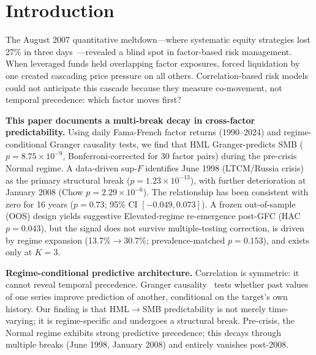 \documentclass[sigconf,anonymous]{acmart}
\begin{document}

\maketitle

\section{Introduction}

The August 2007 quantitative meltdown---where systematic equity strategies
lost 27\% in three days~\cite{khandani2011quants}---revealed a blind spot
in factor-based risk management. When leveraged funds held overlapping factor
exposures, forced liquidation by one created cascading price pressure on all
others. Correlation-based risk models could not anticipate this cascade because
they measure co-movement, not temporal precedence: which factor moves first?

\textbf{This paper documents a multi-break decay in cross-factor predictability.}
Using daily Fama-French factor returns (1990--2024) and regime-conditional
Granger causality tests, we find that HML Granger-predicts SMB
($p = 8.75 \times 10^{-9}$, Bonferroni-corrected for 30 factor pairs) during the
pre-crisis Normal regime. A data-driven sup-$F$ identifies June 1998 (LTCM/Russia crisis)
as the primary structural break ($p = 1.23\times10^{-13}$), with further
deterioration at January 2008 (Chow $p = 2.29\times10^{-6}$).
The relationship has been consistent with zero
for 16 years ($p = 0.73$; 95\% CI $[-0.049, 0.073]$).
A frozen out-of-sample (OOS) design yields suggestive Elevated-regime
re-emergence post-GFC (HAC $p = 0.043$), but the signal does not survive
multiple-testing correction, is driven by regime expansion
(13.7\%$\to$30.7\%; prevalence-matched $p = 0.153$), and exists only at $K{=}3$.

\textbf{Regime-conditional predictive architecture.}
Correlation is symmetric: it cannot reveal temporal precedence. Granger
causality~\cite{granger1969investigating} tests whether past values of one
series improve prediction of another, conditional on the target's own history.
Our finding is that HML$\to$SMB predictability is not merely time-varying;
it is regime-specific and undergoes a structural break. Pre-crisis, the Normal
regime exhibits strong predictive precedence; this decays through multiple breaks
(June 1998, January 2008) and entirely vanishes post-2008.
\end{document}
